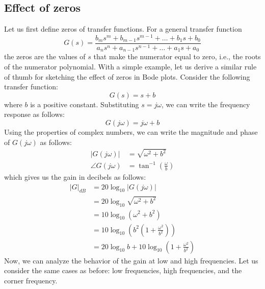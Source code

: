 \documentclass{ee122_notes}
\begin{document}
\subsection{Effect of zeros}
Let us first define zeros of transfer functions. For a general transfer function 
\[ 
G(s) = \frac{b_ms^m + b_{m-1}s^{m-1} + \ldots + b_1 s + b_0}{a_ns^n + a_{n-1}s^{n-1} + \ldots + a_1 s + a_0}
\]
the zeros are the values of \( s \) that make the numerator equal to zero, i.e., the roots of the numerator polynomial. With a simple example, let us derive a similar rule of thumb for sketching the effect of zeros in Bode plots. Consider the following transfer function:
\[
G(s) = s + b 
\]
where \( b \) is a positive constant. Substituting \( s = j\omega \), we can write the frequency response as follows:
\[
G(j\omega) = j\omega + b
\]
Using the properties of complex numbers, we can write the magnitude and phase of \( G(j\omega) \) as follows:
\begin{align*}
|G(j\omega)| &= \sqrt{\omega^2 + b^2} \\
\angle G(j\omega) &= \tan^{-1}\left(\frac{\omega}{b}\right)
\end{align*}
which gives us the gain in decibels as follows:
\begin{align*}
|G|_{dB} &= 20 \log_{10} |G(j\omega)| \\
&= 20 \log_{10} \sqrt{\omega^2 + b^2} \\
&= 10 \log_{10} (\omega^2 + b^2) \\
&= 10 \log_{10} (b^2 (1 + \frac{\omega^2}{b^2})) \\
&= 20 \log_{10} b + 10 \log_{10} (1 + \frac{\omega^2}{b^2})
\end{align*}
Now, we can analyze the behavior of the gain at low and high frequencies. Let us consider the same cases as before: low frequencies, high frequencies, and the corner frequency.
\end{document}
